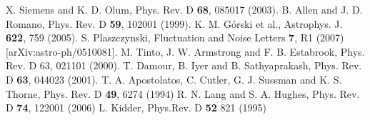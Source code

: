 \documentclass{iopart}
\begin{document}
\begin{thebibliography}{99}
%
 X. Siemens and K. D. Olum, Phys. Rev. D {\bf 68}, 085017 (2003).
%
 B. Allen and J. D. Romano, Phys. Rev. D {\bf 59}, 102001 (1999).
%
 K. M. G\'orski et al., Astrophys. J. {\bf 622}, 759 (2005).
%
 S. Plaszczynski, Fluctuation and Noise Letters {\bf 7}, R1 (2007) [arXiv:astro-ph/0510081].
%
 M. Tinto, J. W. Armstrong and F. B. Estabrook, Phys. Rev. D 63, 021101 (2000).
%
 T. Damour, B. Iyer and B. Sathyaprakash, Phys. Rev. D {\bf 63}, 044023 (2001).
%
 T. A. Apostolatos, C. Cutler, G. J. Sussman and K. S. Thorne, Phys. Rev. D {\bf 49},
6274 (1994)
%
 R. N. Lang and S. A. Hughes, Phys. Rev. D {\bf 74}, 122001 (2006) 
%
 L. Kidder, Phys.Rev. D {\bf 52}  821 (1995)

\end{thebibliography}
\end{document}
